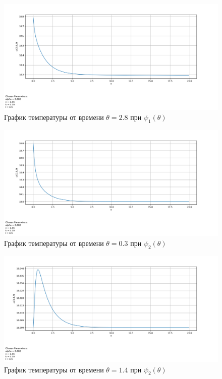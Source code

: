 {{\begin{figure}[H]
    \centering                             
	\includegraphics[width=\textwidth,height=\textheight,keepaspectratio]{kir/var_1_z_2t8.png}                 
	\caption{ График температуры от времени $\theta=2.8$ при $\psi_1(\theta)$}
	\label{grapics9}                           
\end{figure}              
\begin{figure}[H]
    \centering                             
	\includegraphics[width=\textwidth,height=\textheight,keepaspectratio]{pos/var_2_z_0t3.png}                 
	\caption{ График температуры от времени $\theta=0.3$ при $\psi_2(\theta)$}
	\label{grapics10}                           
\end{figure}               

\begin{figure}[H]
    \centering                             
	\includegraphics[width=\textwidth,height=\textheight,keepaspectratio]{pos/var_2_z_1t4.png}                 
	\caption{ График температуры от времени $\theta=1.4$ при $\psi_2(\theta)$}
	\label{grapics11}                           
\end{figure}                                  

}}

